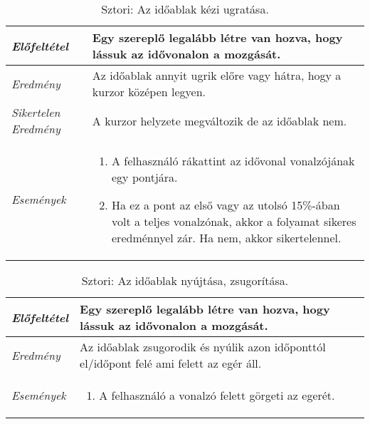 \begin{table}[H]
	\centering
	\begin{tabular}{ | m{} | m{} | }
		\hline
		\emph{Előfeltétel} & Egy szereplő legalább létre van hozva, hogy lássuk az idővonalon a mozgását.\\
		\hline
		\emph{Eredmény} & Az időablak annyit ugrik előre vagy hátra, hogy a kurzor középen legyen. \\
		\hline
		\emph{Sikertelen Eredmény} & A kurzor helyzete megváltozik de az időablak nem.  \\
		\hline
		\hline
		\emph{Események} &

		\begin{enumerate}[itemsep=-1ex]
			\item A felhasználó rákattint az idővonal vonalzójának egy pontjára.
			\item Ha ez a pont az első vagy az utolsó 15\%-ában volt a teljes vonalzónak, akkor a folyamat sikeres eredménnyel zár. Ha nem, akkor sikertelennel.
		\end{enumerate}
		\\
		\hline
	\end{tabular}
	\caption{Sztori: Az időablak kézi ugratása.}
	\label{tab:story-timeline-manual-jump}
\end{table}

\begin{table}[H]
	\centering
	\begin{tabular}{ | m{} | m{} | }
		\hline
		\emph{Előfeltétel} & Egy szereplő legalább létre van hozva, hogy lássuk az idővonalon a mozgását.\\
		\hline
		\emph{Eredmény} & Az időablak zsugorodik és nyúlik azon időponttól el/időpont felé ami felett az egér áll. \\
		\hline
		\hline
		\emph{Események} &

		\begin{enumerate}[itemsep=-1ex]
			\item A felhasználó a vonalzó felett görgeti az egerét.
		\end{enumerate}
		\\
		\hline
	\end{tabular}
	\caption{Sztori: Az időablak nyújtása, zsugorítása.}
	\label{tab:story-timeline-zoom}
\end{table}


